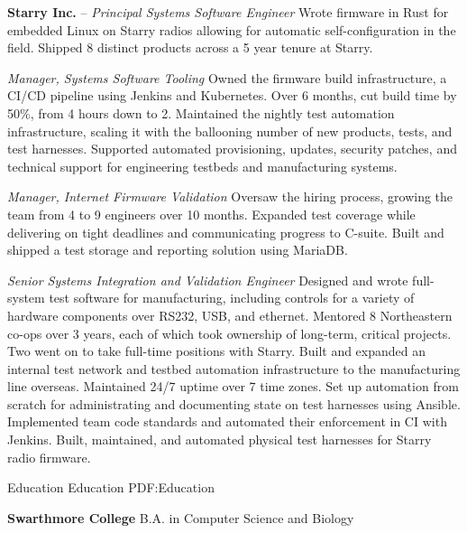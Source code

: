\documentclass[letterpaper,MMMyyyy,nonstopmode]{simpleresumecv}
\begin{document}
\begin{Body}
\BigGap

\Entry
\textbf{Starry Inc.}
\hfill
{} --
\Gap
\textit{Principal Systems Software Engineer}
\Gap
\BulletItem
Wrote firmware in Rust for embedded Linux on Starry radios allowing for
automatic self-configuration in the field.
\BulletItem
Shipped 8 distinct products across a 5 year tenure at Starry.

\BigGap
\textit{Manager, Systems Software Tooling}
\Gap
\BulletItem
Owned the firmware build infrastructure, a CI/CD pipeline using Jenkins and
Kubernetes. Over 6 months, cut build time by 50\%, from 4 hours down to 2.
\BulletItem
Maintained the nightly test automation infrastructure, scaling it with
the ballooning number of new products, tests, and test harnesses.
\BulletItem
Supported automated provisioning, updates, security patches, and
technical support for engineering testbeds and manufacturing systems.

\BigGap
\textit{Manager, Internet Firmware Validation}
\Gap
\BulletItem
Oversaw the hiring process, growing the team from 4 to 9 engineers over 10
months.
\BulletItem
Expanded test coverage while delivering on tight deadlines and
communicating progress to C-suite.
\BulletItem
Built and shipped a test storage and reporting solution using MariaDB.

\BigGap
\textit{Senior Systems Integration and Validation Engineer}
\Gap
\BulletItem
Designed and wrote full-system test software for manufacturing,
including controls for a variety of hardware components over RS232,
USB, and ethernet.
\BulletItem
Mentored 8 Northeastern co-ops over 3 years, each of which took ownership of
long-term, critical projects. Two went on to take full-time positions with
Starry.
\BulletItem
Built and expanded an internal test network and testbed automation
infrastructure to the manufacturing line overseas. Maintained 24/7 uptime over
7 time zones.
\BulletItem
Set up automation from scratch for administrating and documenting
state on test harnesses using Ansible.
\BulletItem
Implemented team code standards and automated their enforcement in CI with
Jenkins.
\BulletItem
Built, maintained, and automated physical test harnesses for Starry radio
firmware.

\Section
{Education}
{Education}
{PDF:Education}

\Entry
\textbf{Swarthmore College}
\Gap
B.A. in Computer Science and Biology

\end{Body}
\end{document}
